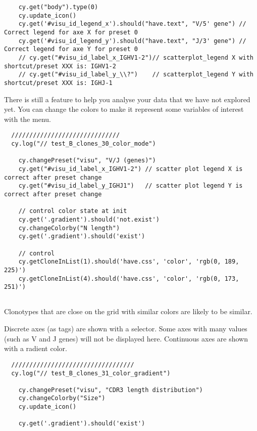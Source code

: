 \begin{verbatim}
    cy.get("body").type(0)
    cy.update_icon()
    cy.get('#visu_id_legend_x').should("have.text", "V/5' gene") // Correct legend for axe X for preset 0
    cy.get('#visu_id_legend_y').should("have.text", "J/3' gene") // Correct legend for axe Y for preset 0
    // cy.get("#visu_id_label_x_IGHV1-2")// scatterplot_legend X with shortcut/preset XXX is: IGHV1-2
    // cy.get("#visu_id_label_y_\\?")    // scatterplot_legend Y with shortcut/preset XXX is: IGHJ-1

\end{verbatim}

There is still a feature to help you analyse your data that we have not
explored yet.
You can change the colors to make it represent some variables of interest
with the  menu.
\begin{verbatim}
  //////////////////////////////
  cy.log("// test_B_clones_30_color_mode")

    cy.changePreset("visu", "V/J (genes)")
    cy.get("#visu_id_label_x_IGHV1-2") // scatter plot legend X is correct after preset change
    cy.get("#visu_id_label_y_IGHJ1")   // scatter plot legend Y is correct after preset change

    // control color state at init
    cy.get('.gradient').should('not.exist')
    cy.changeColorby("N length")
    cy.get('.gradient').should('exist')

    // control
    cy.getCloneInList(1).should('have.css', 'color', 'rgb(0, 189, 225)')
    cy.getCloneInList(4).should('have.css', 'color', 'rgb(0, 173, 251)')


\end{verbatim}
  
Clonotypes that are close on the grid with similar colors are likely to
be similar.

Discrete axes (as tags) are shown with a selector.
Some axes with many values (such as V and J genes) will not be displayed here.
Continuous axes are shown with a radient color.
\begin{verbatim}
  //////////////////////////////////
  cy.log("// test_B_clones_31_color_gradient")

    cy.changePreset("visu", "CDR3 length distribution")
    cy.changeColorby("Size")
    cy.update_icon()

    cy.get('.gradient').should('exist')


\end{verbatim}


